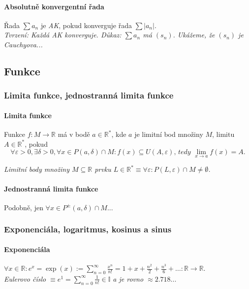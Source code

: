 \documentclass[10pt,a4paper]{article}
\newcommand{\R}{{\mathbb{R}}}
\begin{document}
\paragraph*{Absolutně konvergentní řada} Řada $\sum a_n$ je \textit{AK}, pokud konverguje řada $\sum |a_n|$.
\\ \textit{Tvrzení: Každá AK konverguje. Důkaz: $\sum a_n$ má $(s_n)$. Ukážeme, že $(s_n)$ je Cauchyova...}

\subsection{Funkce}
\subsubsection{Limita funkce, jednostranná limita funkce}

\paragraph*{Limita funkce}

Funkce $f: M\to \R$ má v bodě $a \in \R^*$, kde $a$ je limitní bod množiny $M$, limitu $A \in \R^*$, pokud
\[
    \forall \varepsilon >0, \exists \delta>0, \forall x \in P(a, \delta) \cap M : f(x) \subseteq U (A, \varepsilon)\textit{, tedy } \displaystyle \lim_{x\to a}f(x) = A.
\]

\textit{Limitní body množiny $M\subseteq \R$ prvku $L\in \R^* \equiv \forall \varepsilon:P(L, \varepsilon) \cap M \neq \emptyset$.}

\paragraph*{Jednostranná limita funkce} Podobně, jen $\forall x \in P^{\pm}(a, \delta) \cap M ...$

\subsubsection{Exponenciála, logaritmus, kosinus a sinus}
\paragraph*{Exponenciála} $\displaystyle \forall x \in \R: e^x = \exp(x) := \sum_{n=0}^{\infty} \frac{x^n}{n!} = 1+x+\frac{n^2}2 + \frac{n^3}6 + \dots : \R \to \R$.\\
\textit{Eulerovo číslo $\equiv e^1 = \displaystyle \sum_{n=0}^{\infty} \frac{1}{n!} \in \mathbb{I}$ a je rovno $\approx 2.718...$}
\end{document}
